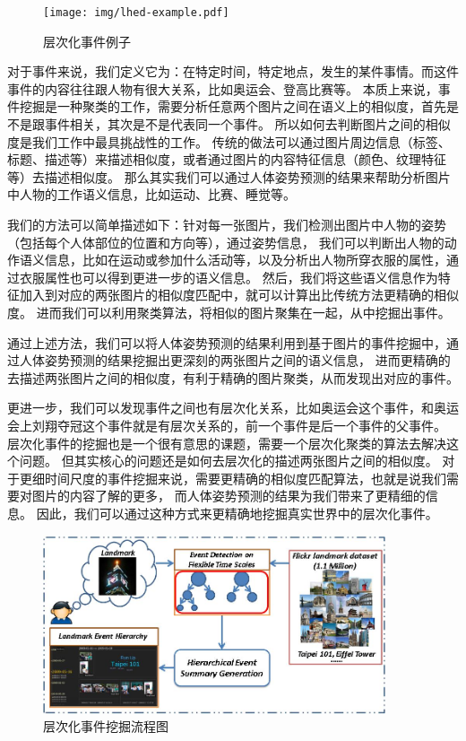 \begin{figure}
\centering
\texttt{[image: img/lhed-example.pdf]}
\caption{层次化事件例子}
\label{fig:lhed}
\end{figure}

对于事件来说，我们定义它为：在特定时间，特定地点，发生的某件事情。而这件事件的内容往往跟人物有很大关系，比如奥运会、登高比赛等。
本质上来说，事件挖掘是一种聚类的工作，需要分析任意两个图片之间在语义上的相似度，首先是不是跟事件相关，其次是不是代表同一个事件。
所以如何去判断图片之间的相似度是我们工作中最具挑战性的工作。
传统的做法可以通过图片周边信息（标签、标题、描述等）来描述相似度，或者通过图片的内容特征信息（颜色、纹理特征等）去描述相似度。
那么其实我们可以通过人体姿势预测的结果来帮助分析图片中人物的工作语义信息，比如运动、比赛、睡觉等。

我们的方法可以简单描述如下：针对每一张图片，我们检测出图片中人物的姿势（包括每个人体部位的位置和方向等），通过姿势信息，
我们可以判断出人物的动作语义信息，比如在运动或参加什么活动等，以及分析出人物所穿衣服的属性，通过衣服属性也可以得到更进一步的语义信息。
然后，我们将这些语义信息作为特征加入到对应的两张图片的相似度匹配中，就可以计算出比传统方法更精确的相似度。
进而我们可以利用聚类算法，将相似的图片聚集在一起，从中挖掘出事件。



通过上述方法，我们可以将人体姿势预测的结果利用到基于图片的事件挖掘中，通过人体姿势预测的结果挖掘出更深刻的两张图片之间的语义信息，
进而更精确的去描述两张图片之间的相似度，有利于精确的图片聚类，从而发现出对应的事件。

更进一步，我们可以发现事件之间也有层次化关系，比如奥运会这个事件，和奥运会上刘翔夺冠这个事件就是有层次关系的，前一个事件是后一个事件的父事件。
层次化事件的挖掘也是一个很有意思的课题，需要一个层次化聚类的算法去解决这个问题。
但其实核心的问题还是如何去层次化的描述两张图片之间的相似度。
对于更细时间尺度的事件挖掘来说，需要更精确的相似度匹配算法，也就是说我们需要对图片的内容了解的更多，
而人体姿势预测的结果为我们带来了更精细的信息。
因此，我们可以通过这种方式来更精确地挖掘真实世界中的层次化事件。

\begin{figure}
\centering
\includegraphics[width=0.9\textwidth]{img/architecture.jpg}
\caption{层次化事件挖掘流程图}
\label{fig:architecture}
\end{figure}

